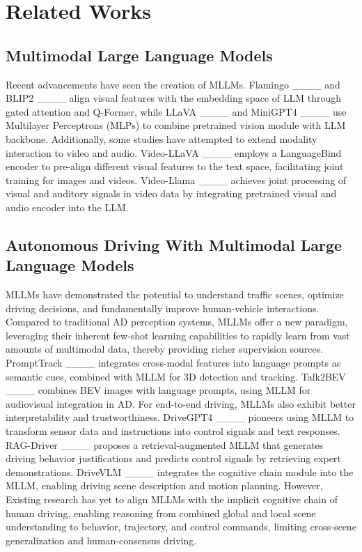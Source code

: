 \section{Related Works}
\label{submission}

\subsection{Multimodal Large Language Models}

Recent advancements have seen the creation of MLLMs. Flamingo ____ and BLIP2 ____ align visual features with the embedding space of LLM through gated attention and Q-Former, while LLaVA ____ and MiniGPT4 ____ use Multilayer Perceptrons (MLPs) to combine pretrained vision module with LLM backbone. Additionally, some studies have attempted to extend modality interaction to video and audio. Video-LLaVA ____ employs a LanguageBind encoder to pre-align different visual features to the text space, facilitating joint training for images and videos. Video-Llama ____ achieves joint processing of visual and auditory signals in video data by integrating pretrained visual and audio encoder into the LLM.

\subsection{Autonomous Driving With Multimodal Large Language Models}

MLLMs have demonstrated the potential to understand traffic scenes, optimize driving decisions, and fundamentally improve human-vehicle interactions. Compared to traditional AD perception systems, MLLMs offer a new paradigm, leveraging their inherent few-shot learning capabilities to rapidly learn from vast amounts of multimodal data, thereby providing richer supervision sources. PromptTrack ____ integrates cross-modal features into language prompts as semantic cues, combined with MLLM for 3D detection and tracking.  Talk2BEV ____ combines BEV images with language prompts, using MLLM for audiovisual integration in AD. For end-to-end driving, MLLMs also exhibit better interpretability and trustworthiness. DriveGPT4 ____ pioneers using MLLM to transform sensor data and instructions into control signals and text responses. RAG-Driver ____ proposes a retrieval-augmented MLLM that generates driving behavior justifications and predicts control signals by retrieving expert demonstrations. DriveVLM ____ integrates the cognitive chain module into the MLLM, enabling driving scene description and motion planning. However, Existing research has yet to align MLLMs with the implicit cognitive chain of human driving, enabling reasoning from combined global and local scene understanding to behavior, trajectory, and control commands, limiting cross-scene generalization and human-consensus driving.

